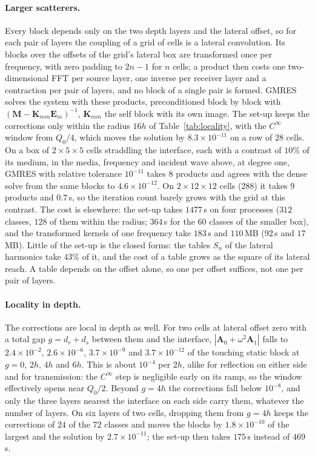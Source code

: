 \documentclass[11pt,a4paper]{article}
\newcommand{\bK}{\mathbf{K}}
\begin{document}
\paragraph{Larger scatterers.} Every block depends only on the two depth layers and the lateral offset, so for
each pair of layers the coupling of a grid of cells is a lateral convolution. Its blocks over the offsets of the
grid's lateral box are transformed once per frequency, with zero padding to $2n-1$ for $n$ cells; a product then
costs one two-dimensional FFT per source layer, one inverse per receiver layer and a contraction per pair of
layers, and no block of a single pair is formed. GMRES solves the system with these products, preconditioned
block by block with $(\mathbf M-\bK_{mm}\mathbf E_m)^{-1}$, $\bK_{mm}$ the self block with its own image. The
set-up keeps the corrections only within the radius $16h$ of Table~\ref{tab:locality}, with the $C^\infty$ window
from $Q_0/4$, which moves the solution by $8.3\times10^{-11}$ on a row of $28$ cells. On a box of
$2\times5\times5$ cells straddling the interface, each with a contrast of $10\%$ of its medium, in the media,
frequency and incident wave above, at degree one, GMRES with relative tolerance $10^{-11}$ takes $8$ products and
agrees with the dense solve from the same blocks to $4.6\times10^{-12}$. On $2\times12\times12$ cells ($288$) it
takes $9$ products and $0.7$\,s, so the iteration count barely grows with the grid at this contrast. The cost is
elsewhere: the set-up takes $1477$\,s on four processes ($312$ classes, $128$ of them within the radius; $364$\,s
for the $60$ classes of the smaller box), and the transformed kernels of one frequency take $183$\,s and
$110$\,MB ($92$\,s and $17$\,MB). Little of the set-up is the closed forms: the tables $S_n$ of the lateral
harmonics take $43\%$ of it, and the cost of a table grows as the square of its lateral reach. A table depends on
the offset alone, so one per offset suffices, not one per pair of layers.

\paragraph{Locality in depth.} The corrections are local in depth as well. For two cells at lateral offset zero
with a total gap $g=d_r+d_s$ between them and the interface, $|\mathbf A_0+\omega^2\mathbf A_1|$ falls to
$2.4\times10^{-2}$, $2.6\times10^{-6}$, $3.7\times10^{-9}$ and $3.7\times10^{-12}$ of the touching static block at
$g=0$, $2h$, $4h$ and $6h$. This is about $10^{-4}$ per $2h$, alike for reflection on either side and for
transmission: the $C^\infty$ step is negligible early on its ramp, so the window effectively opens near $Q_0/2$.
Beyond $g=4h$ the corrections fall below $10^{-8}$, and only the three layers nearest the interface on each side
carry them, whatever the number of layers. On six layers of two cells, dropping them from $g=4h$ keeps the
corrections of $24$ of the $72$ classes and moves the blocks by $1.8\times10^{-10}$ of the largest and the
solution by $2.7\times10^{-11}$; the set-up then takes $175$\,s instead of $469$\,s.
\end{document}
